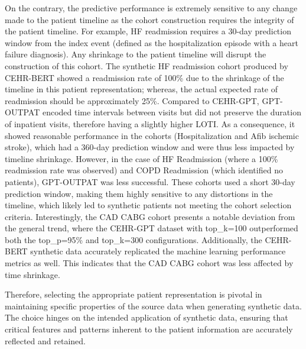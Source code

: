 \begin{multicols}{2}
On the contrary, the predictive performance is extremely sensitive to any change made to the patient timeline as the cohort construction requires the integrity of the patient timeline. For example, HF readmission requires a 30-day prediction window from the index event (defined as the hospitalization episode with a heart failure diagnosis). Any shrinkage to the patient timeline will disrupt the construction of this cohort. The synthetic HF readmission cohort produced by CEHR-BERT showed a readmission rate of 100\% due to the shrinkage of the timeline in this patient representation; whereas, the actual expected rate of readmission should be approximately 25\%. Compared to CEHR-GPT, GPT-OUTPAT encoded time intervals between visits but did not preserve the duration of inpatient visits, therefore having a slightly higher LOTI. As a consequence, it showed reasonable performance in the cohorts (Hospitalization and Afib ischemic stroke), which had a 360-day prediction window and were thus less impacted by timeline shrinkage. However, in the case of HF Readmission (where a 100\% readmission rate was observed) and COPD Readmission (which identified no patients), GPT-OUTPAT was less successful. These cohorts used a short 30-day prediction window, making them highly sensitive to any distortions in the timeline, which likely led to synthetic patients not meeting the cohort selection criteria. Interestingly, the CAD CABG cohort presents a notable deviation from the general trend, where the CEHR-GPT dataset with top\_k=100 outperformed both the top\_p=95\% and top\_k=300 configurations. Additionally, the CEHR-BERT synthetic data accurately replicated the machine learning performance metrics as well. This indicates that the CAD CABG cohort was less affected by time shrinkage. 

Therefore, selecting the appropriate patient representation is pivotal in maintaining specific properties of the source data when generating synthetic data. The choice hinges on the intended application of synthetic data, ensuring that critical features and patterns inherent to the patient information are accurately reflected and retained.


\end{multicols}
